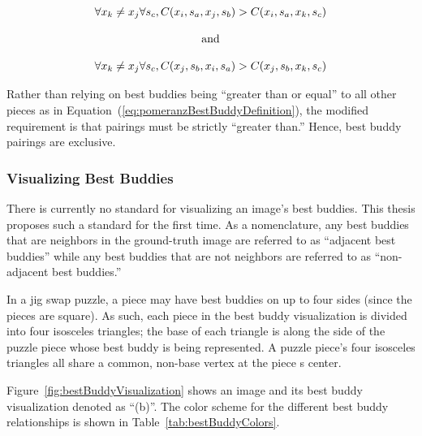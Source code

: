 \documentclass{report}
\def\eref#1{(\ref{#1})}
\begin{document}
\begin{equation} \label{eq:hammoudehBestBuddyDefinition}
\centering
\begin{split}
	\begin{matrix}
		\forall{x_{k} \ne x_{j}}\forall{s_c},C(x_i, s_a, x_j, s_b) > C(x_i, s_a, x_k, s_c)
		\\
		\\
		\textnormal{and}
		\\
		\\
		\forall{x_{k} \ne x_{j}}\forall{s_c},C(x_j, s_b, x_i, s_a) > C(x_j, s_b, x_k, s_c)
	\end{matrix}
\end{split}
\end{equation}

Rather than relying on best buddies being ``greater than or equal'' to all other pieces as in Equation~\eref{eq:pomeranzBestBuddyDefinition}, the modified requirement is that pairings must be strictly ``greater than.''  Hence, best buddy pairings are exclusive.

\subsubsection{Visualizing Best Buddies}\label{sec:visualizingBestBuddies}

There is currently no standard for visualizing an image's best buddies.  This thesis proposes such a standard for the first time.  As a nomenclature, any best buddies that are neighbors in the ground-truth image are referred to as ``adjacent best buddies'' while any best buddies that are not neighbors are referred to as ``non-adjacent best buddies.''

In a jig swap puzzle, a piece may have best buddies on up to four sides (since the pieces are square).  As such, each piece in the best buddy visualization is divided into four isosceles triangles; the base of each triangle is along the side of the puzzle piece whose best buddy is being represented.  A puzzle piece's four isosceles triangles all share a common, non-base vertex at the piece
s center.  

Figure~\ref{fig:bestBuddyVisualization} shows an image and its best buddy visualization denoted as ``(b)''. The color scheme for the different best buddy relationships is shown in Table~\ref{tab:bestBuddyColors}.
\end{document}
